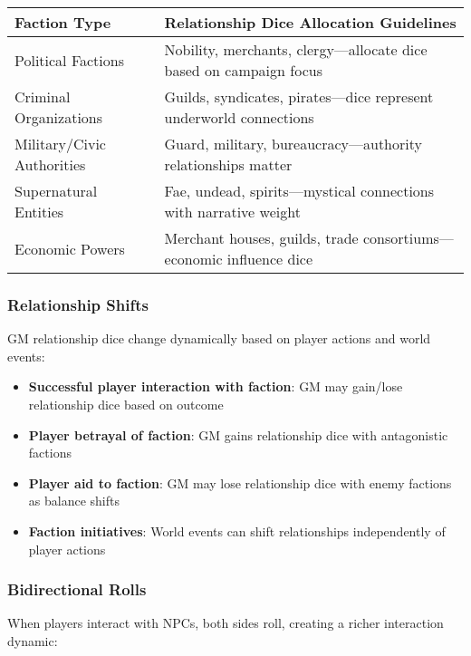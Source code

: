 \begin{fatebox}
\begin{tabularx}{\textwidth}{lX}
\toprule
\textbf{Faction Type} & \textbf{Relationship Dice Allocation Guidelines} \\
\midrule
Political Factions & Nobility, merchants, clergy---allocate dice based on campaign focus \\
Criminal Organizations & Guilds, syndicates, pirates---dice represent underworld connections \\
Military/Civic Authorities & Guard, military, bureaucracy---authority relationships matter \\
Supernatural Entities & Fae, undead, spirits---mystical connections with narrative weight \\
Economic Powers & Merchant houses, guilds, trade consortiums---economic influence dice \\
\bottomrule
\end{tabularx}
\end{fatebox}

\subsubsection*{Relationship Shifts}

GM relationship dice change dynamically based on player actions and world events:

\begin{itemize}
    \item \textbf{Successful player interaction with faction}: GM may gain/lose relationship dice based on outcome
    \item \textbf{Player betrayal of faction}: GM gains relationship dice with antagonistic factions
    \item \textbf{Player aid to faction}: GM may lose relationship dice with enemy factions as balance shifts
    \item \textbf{Faction initiatives}: World events can shift relationships independently of player actions
\end{itemize}

\subsubsection*{Bidirectional Rolls}

When players interact with NPCs, both sides roll, creating a richer interaction dynamic:

